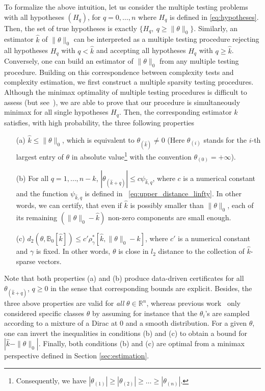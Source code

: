 \documentclass[twoside,11pt]{article}
\def\bbB{\mathbb{B}}
\newcommand{\<}{\langle}
\renewcommand{\>}{\rangle}
\begin{document}
To formalize the above intuition, let us consider the multiple testing problems with all hypotheses $(H_{q})$, for $q=0,\ldots, n$ where $H_{q}$ is defined in \eqref{eq:hypotheses}. Then, the set of true hypotheses is exactly  $\{H_{q},\  q\geq \|\theta\|_0\}$. Similarly, an estimator $\widehat{k}$ of $\|\theta\|_0$ can be interpreted as a multiple testing procedure rejecting all hypotheses $H_{q}$ with $q< \widehat{k}$ and accepting all hypotheses $H_q$ with $q\geq \widehat{k}$. Conversely, one can build an estimator of $\|\theta\|_0$ from any multiple testing procedure. Building on this correspondence between  complexity tests and complexity estimation, we first construct a multiple sparsity testing procedures. Although the minimax optimality of multiple testing procedures is difficult to assess (but see~\cite{2016_fromont}), we are able to prove that our procedure is simultaneously minimax for all single hypotheses $H_{q}$. 
 Then, the corresponding estimator $\widehat{k}$ satisfies, with high probability, the three following properties
\begin{enumerate}
 \item[(a)] $\widehat{k}\leq \|\theta\|_0$, which is equivalent to $\theta_{(\widehat{k})}\neq 0$ (Here $\theta_{(i)}$ stands  for the $i$-th largest entry of $\theta$ in absolute value\footnote{Consequently, we have $|\theta_{(1)}|\geq|\theta_{(2)}|\geq \ldots \geq |\theta_{(n)}|$.} with the convention $\theta_{(0)}=+\infty$).
 \item[(b)] For all $q=1,\ldots, n-\widehat{k}$,  $|\theta_{(\widehat{k}+q)}|\leq c\psi_{\hat{k},q}$, 
where $c$ is a numerical constant and the function $\psi_{\widehat{k},q}$ is defined in ~\eqref{eq:upper_distance_linfty}. In other words, we can certify, that even if 
 $\widehat{k}$ is possibly smaller than $\|\theta\|_0$, each of its remaining $(\|\theta\|_0-\widehat{k})$ non-zero components are small enough. 
 \item [(c)]  $d_2(\theta,\bbB_0[\widehat{k}])\leq c' \rho_{\gamma}^{*}[\widehat{k}, \|\theta\|_0-\widehat{k}]$, where $c'$ is a numerical constant and $\gamma$ is fixed. In other words, $\theta$ is close in $l_2$ distance to the collection of $\widehat{k}$-sparse vectors.
\end{enumerate}
Note that both properties (a) and (b) produce data-driven certificates for all $\theta_{(\widehat{k}+q)}$,  $q\geq 0$ in the sense that corresponding bounds are explicit. 
Besides, the three above properties are valid  for {\it all} $\theta\in \mathbb{R}^n$, whereas previous work~\cite{MR2382653,MR2325113,MR2589318} only considered specific classes $\theta$ by assuming for instance that the $\theta_i$'s are sampled according to a mixture of a Dirac at $0$ and a smooth distribution. For a given $\theta$, one can invert the inequalities in conditions (b) and (c) to obtain a bound for $|\widehat{k}-\|\theta\|_0|$. Finally, both conditions (b) and (c) are optimal from a minimax perspective defined in Section \ref{sec:estimation}. 
\end{document}
